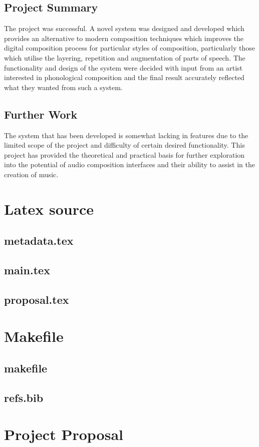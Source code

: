 \documentclass[12pt,a4paper,twoside,openright]{report}
\begin{document}
\section{Project Summary}
The project was successful. A novel system was designed and developed which provides an alternative to modern composition techniques which improves the digital composition process for particular styles of composition, particularly those which utilise the layering, repetition and augmentation of parts of speech. The functionality and design of the system were decided with input from an artist interested in phonological composition and the final result accurately reflected what they wanted from such a system.

\section{Further Work}
The system that has been developed is somewhat lacking in features due to the limited scope of the project and difficulty of certain desired functionality. This project has provided the theoretical and practical basis for further exploration into the potential of audio composition interfaces and their ability to assist in the creation of music.



\appendix

\chapter{Latex source}

\section{metadata.tex}
{\scriptsize}

\section{main.tex}
{\scriptsize}

\section{proposal.tex}
{\scriptsize}

\chapter{Makefile}

\section{makefile}\label{makefile}
{\scriptsize}

\section{refs.bib}
{\scriptsize}


\chapter{Project Proposal}


\end{document}
